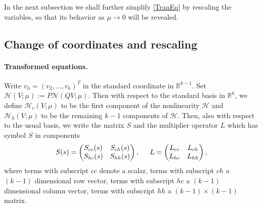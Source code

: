 \documentclass[letterpaper,11pt]{article}
\newcommand{\R}{\mathbb{R}}
\newcommand{\Nl}{\mathcal{N}}
\newcommand{\K}{\mathcal{K}}
\numberwithin{equation}{section}
\theoremstyle{plain}
\theoremstyle{remark}
\begin{document}
In the next subsection we shall further simplify \eqref{TranEq} by rescaling the variables, so that its behavior as $\mu \to 0$ will be revealed.


\subsection{Change of coordinates and rescaling }






\paragraph{Transformed equations.} 
Write $v_h = (v_2,\ldots,v_{k})^T$ in the standard coordinate in $\R^{k-1}$. Set $\mathcal{H}(V;\mu) :=P\Nl(QV;\mu)$. Then with respect to the standard basis in $\R^k$, we define $\mathcal{H}_c(V;\mu)$ to be the first component of the nonlinearity $\mathcal{H}$ and $\mathcal{H}_h(V;\mu)$ to be the remaining $k-1$ components of $\mathcal{H}$. Then, also with respect to the usual basis, we write the matrix $S$ and the multiplier operator $L$ which has symbol $S$ in components 
\[
S(s) = \begin{pmatrix}
S_{cc}(s) & S_{ch}(s)\\
S_{hc}(s) & S_{hh}(s) 
\end{pmatrix}, \hspace{0.2in}
L  = \begin{pmatrix}
L_{cc} & L_{ch} \\
L_{hc} & L_{hh} 
\end{pmatrix},
\]
where terms with subscript $cc$ denote a scalar, terms with subscript $ch$ a $(k-1)$ dimensional row vector, terms with subscript $hc$ a $(k-1)$ dimensional column vector, terms with subscript $hh$ a $(k-1)\times (k-1)$ matrix.
\end{document}
